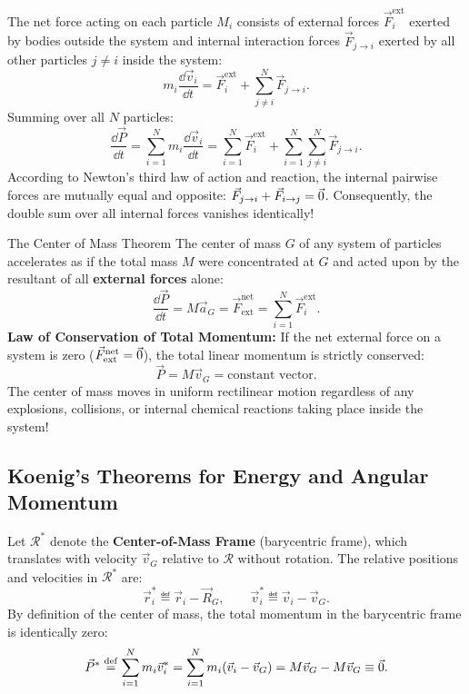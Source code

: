 The net force acting on each particle $M_i$ consists of external forces $\vec{F}_i^{\text{ext}}$ exerted by bodies outside the system and internal interaction forces $\vec{F}_{j \to i}$ exerted by all other particles $j \neq i$ inside the system:
\[
m_i \frac{\dd\vec{v}_i}{\dd t} = \vec{F}_i^{\text{ext}} + \sum_{j \neq i}^N \vec{F}_{j \to i}.
\]
Summing over all $N$ particles:
\[
\frac{\dd\vec{P}}{\dd t} = \sum_{i=1}^N m_i \frac{\dd\vec{v}_i}{\dd t} = \sum_{i=1}^N \vec{F}_i^{\text{ext}} + \sum_{i=1}^N \sum_{j \neq i}^N \vec{F}_{j \to i}.
\]
According to Newton's third law of action and reaction, the internal pairwise forces are mutually equal and opposite: $\vec{F}_{j \to i} + \vec{F}_{i \to j} = \vec{0}$. Consequently, the double sum over all internal forces vanishes identically!

\begin{lawbox}{The Center of Mass Theorem}
The center of mass $G$ of any system of particles accelerates as if the total mass $M$ were concentrated at $G$ and acted upon by the resultant of all \textbf{external forces} alone:
\begin{equation}
\frac{\dd\vec{P}}{\dd t} = M \vec{a}_G = \vec{F}_{\text{ext}}^{\text{net}} = \sum_{i=1}^N \vec{F}_i^{\text{ext}}.
\end{equation}
\textbf{Law of Conservation of Total Momentum:} If the net external force on a system is zero ($\vec{F}_{\text{ext}}^{\text{net}} = \vec{0}$), the total linear momentum is strictly conserved:
\begin{equation}
\vec{P} = M \vec{v}_G = \text{constant vector}.
\end{equation}
The center of mass moves in uniform rectilinear motion regardless of any explosions, collisions, or internal chemical reactions taking place inside the system!
\end{lawbox}

\subsection{Koenig's Theorems for Energy and Angular Momentum}

Let $\mathcal{R}^*$ denote the \textbf{Center-of-Mass Frame} (barycentric frame), which translates with velocity $\vec{v}_G$ relative to $\mathcal{R}$ without rotation.
The relative positions and velocities in $\mathcal{R}^*$ are:
\begin{equation}
\vec{r}_i^* \eqdef \vec{r}_i - \vec{R}_G, \qquad \vec{v}_i^* \eqdef \vec{v}_i - \vec{v}_G.
\end{equation}
By definition of the center of mass, the total momentum in the barycentric frame is identically zero:
\begin{equation}
\vec{P}^* \overset{\mathrm{def}}{=} \sum_{i=1}^N m_i \vec{v}_i^* = \sum_{i=1}^N m_i (\vec{v}_i - \vec{v}_G) = M \vec{v}_G - M \vec{v}_G \equiv \vec{0}.
\end{equation}

